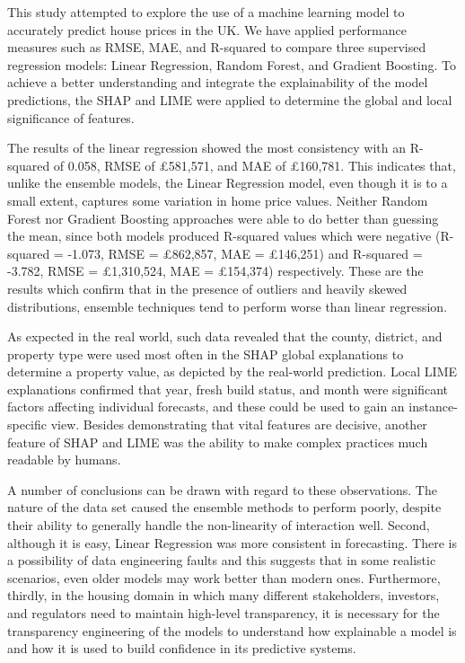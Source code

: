 \documentclass[12pt, a4paper, oneside]{book}
\begin{document}
This study attempted to explore the use of a machine learning model to accurately predict house prices in the UK. We have applied performance measures such as RMSE, MAE, and R-squared to compare three supervised regression models: Linear Regression, Random Forest, and Gradient Boosting. To achieve a better understanding and integrate the explainability of the model predictions, the SHAP and LIME were applied to determine the global and local significance of features.


The results of the linear regression showed the most consistency with an R-squared of 0.058, RMSE of £581,571, and MAE of £160,781. This indicates that, unlike the ensemble models, the Linear Regression model, even though it is to a small extent, captures some variation in home price values. Neither Random Forest nor Gradient Boosting approaches were able to do better than guessing the mean, since both models produced R-squared values which were negative (R-squared = -1.073, RMSE = £862,857, MAE = £146,251) and R-squared = -3.782, RMSE = £1,310,524, MAE = £154,374) respectively. These are the results which confirm that in the presence of outliers and heavily skewed distributions, ensemble techniques tend to perform worse than linear regression.


As expected in the real world, such data revealed that the county, district, and property type were used most often in the SHAP global explanations to determine a property value, as depicted by the real-world prediction. Local LIME explanations confirmed that year, fresh build status, and month were significant factors affecting individual forecasts, and these could be used to gain an instance-specific view. Besides demonstrating that vital features are decisive, another feature of SHAP and LIME was the ability to make complex practices much readable by humans.


 A number of conclusions can be drawn with regard to these observations. The nature of the data set caused the ensemble methods to perform poorly, despite their ability to generally handle the non-linearity of interaction well. Second, although it is easy, Linear Regression was more consistent in forecasting. There is a possibility of data engineering faults and this suggests that in some realistic scenarios, even older models may work better than modern ones. Furthermore, thirdly, in the housing domain in which many different stakeholders, investors, and regulators need to maintain high-level transparency, it is necessary for the transparency engineering of the models to understand how explainable a model is and how it is used to build confidence in its predictive systems.
\end{document}
